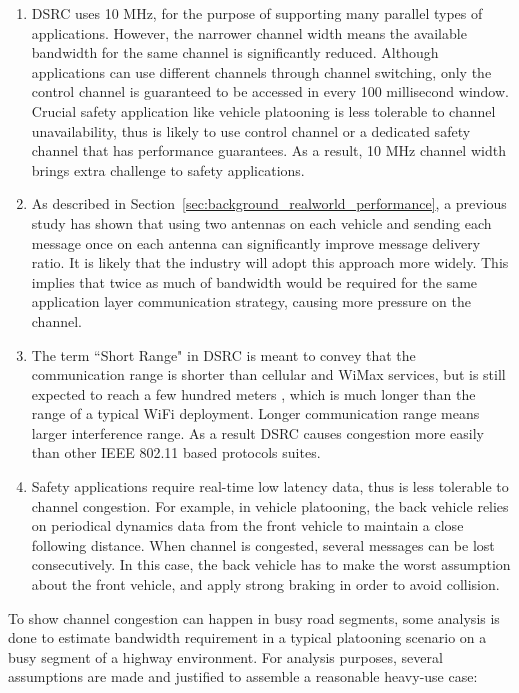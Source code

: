 \documentclass[12pt]{report}
\begin{document}
\begin{enumerate}
  \item DSRC uses 10 MHz, for the purpose of supporting many parallel types of applications. However, the narrower channel width means the available bandwidth for the same channel is significantly reduced. Although applications can use different channels through channel switching, only the control channel is guaranteed to be accessed in every 100 millisecond window. Crucial safety application like vehicle platooning is less tolerable to channel unavailability, thus is likely to use control channel or a dedicated safety channel that has performance guarantees. As a result, 10 MHz channel width brings extra challenge to safety applications.
  \item As described in Section~\ref{sec:background_realworld_performance}, a previous study \cite{songDSRC2016} has shown that using two antennas on each vehicle and sending each message once on each antenna can significantly improve message delivery ratio. It is likely that the industry will adopt this approach more widely. This implies that twice as much of bandwidth would be required for the same application layer communication strategy, causing more pressure on the channel.
  \item The term ``Short Range" in DSRC is meant to convey that the communication range is shorter than cellular and WiMax services, but is still expected to reach a few hundred meters \cite{kenney2011}, which is much longer than the range of a typical WiFi deployment. Longer communication range means larger interference range. As a result DSRC causes congestion more easily than other IEEE 802.11 based protocols suites.
  \item Safety applications require real-time low latency data, thus is less tolerable to channel congestion. For example, in vehicle platooning, the back vehicle relies on periodical dynamics data from the front vehicle to maintain a close following distance. When channel is congested, several messages can be lost consecutively. In this case, the back vehicle has to make the worst assumption about the front vehicle, and apply strong braking in order to avoid collision.
\end{enumerate}

To show channel congestion can happen in busy road segments, some analysis is done to estimate bandwidth requirement in a typical platooning scenario on a busy segment of a highway environment. For analysis purposes, several assumptions are made and justified to assemble a reasonable heavy-use case:
\end{document}
